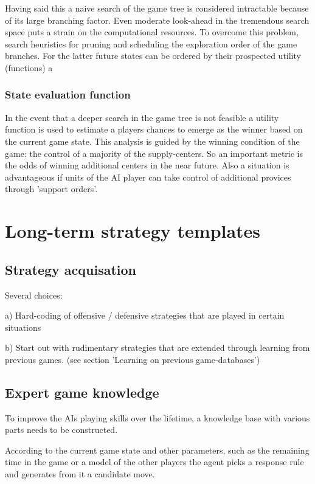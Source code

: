 \documentclass[12pt]{article}
\begin{document}
Having said this a naive search of the game tree is considered
intractable because of its large branching factor. Even moderate look-ahead
in the tremendous search space puts a strain on the computational resources.
To overcome this problem, search heuristics for pruning and scheduling the
exploration order of the game branches. For the latter future states can be
ordered by their prospected utility (functions) a

\subsubsection{State evaluation function}

In the event that a deeper search in the game tree is not feasible a
utility function is used to estimate a players chances to emerge
as the winner based on the current game state. This analysis is guided
by the winning condition of the game: the control of a majority of the 
supply-centers. So an important metric is the odds of winning additional
centers in the near future. Also a situation is advantageous if 
units of the AI player can take control of additional provices
through 'support orders'.

\section{Long-term strategy templates}

\subsection{Strategy acquisation}

Several choices: 

a) Hard-coding of offensive / defensive 
   strategies that are played in certain
   situations

b) Start out with rudimentary strategies that
   are extended through learning from previous games.
   (see section 'Learning on previous game-databases')

\subsection{Expert game knowledge}

To improve the AIs playing skills over the lifetime, a
knowledge base with various parts needs to be constructed.

According to the current game state and other parameters, such
as the remaining time in the game or a model of the other players
the agent picks a response rule and generates from it a candidate
move. 
\end{document}
